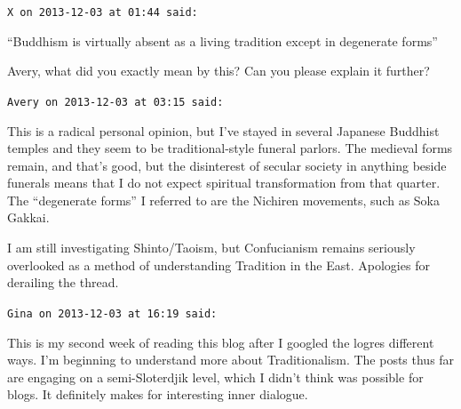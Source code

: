 \begin{footnotesize}
\begin{sffamily}
\hfill

\texttt{X on 2013-12-03 at 01:44 said:}

``Buddhism is virtually absent as a living tradition except in degenerate forms''

Avery, what did you exactly mean by this? Can you please explain it further?

\hfill

\texttt{Avery on 2013-12-03 at 03:15 said:}

This is a radical personal opinion, but I've stayed in several Japanese Buddhist temples and they seem to be traditional-style funeral parlors. The medieval forms remain, and that's good, but the disinterest of secular society in anything beside funerals means that I do not expect spiritual transformation from that quarter. The ``degenerate forms'' I referred to are the Nichiren movements, such as Soka Gakkai.

I am still investigating Shinto/Taoism, but Confucianism remains seriously overlooked as a method of understanding Tradition in the East. Apologies for derailing the thread.

\hfill

\texttt{Gina on 2013-12-03 at 16:19 said:}

This is my second week of reading this blog after I googled the logres different ways. I'm beginning to understand more about Traditionalism. The posts thus far are engaging on a semi-Sloterdjik level, which I didn't think was possible for blogs. It definitely makes for interesting inner dialogue.

\hfill

\end{sffamily}
\end{footnotesize}

